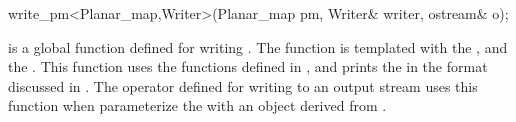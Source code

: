 
\ccRefPageBegin


\begin{ccRefFunction}{write_pm<Planar_map,Writer>(Planar_map pm, Writer& writer, ostream& o);}


\ccDefinition
{} is a global function defined for writing . 
The function is templated with the , and the .  
This function uses the functions defined in , and prints the  
in the format discussed in . 
The operator defined for writing  to an output stream uses this function when parameterize the 
 with an object derived from .


\end{ccRefFunction} %

\ccRefPageEnd











